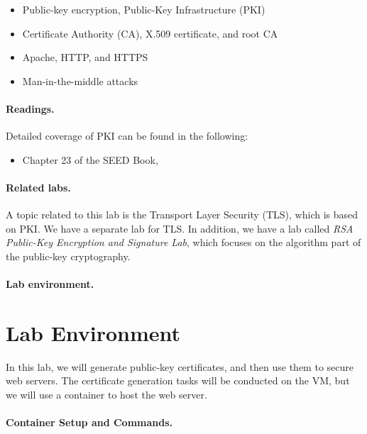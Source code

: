 \begin{itemize}[noitemsep]
\item Public-key encryption, Public-Key Infrastructure (PKI)
\item Certificate Authority (CA), X.509 certificate, and root CA 
\item Apache, HTTP, and HTTPS
\item Man-in-the-middle attacks
\end{itemize}





\paragraph{Readings.}
Detailed coverage of PKI can be found in the following:

\begin{itemize}
\item Chapter 23 of the SEED Book, \seedbook
\end{itemize}


\paragraph{Related labs.}
A topic related to this lab is the Transport Layer Security (TLS), which is based on  
PKI. We have a separate lab for TLS.
In addition, we have a lab called \textit{RSA Public-Key Encryption and Signature Lab}, 
which focuses on the algorithm part of the public-key cryptography.


\paragraph{Lab environment.} \seedenvironmentB 


\section{Lab Environment}

In this lab, we will generate public-key certificates, and then
use them to secure web servers. The certificate generation 
tasks will be conducted on the VM, but we will use 
a container to host the web server. 

\paragraph{Container Setup and Commands.}




